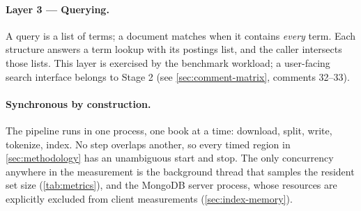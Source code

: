 \paragraph{Layer 3 --- Querying.}
A query is a list of terms; a document matches when it contains \emph{every}
term. Each structure answers a term lookup with its postings list, and the
caller intersects those lists. This layer is exercised by the benchmark
workload; a user-facing search interface belongs to Stage 2 (see
\cref{sec:comment-matrix}, comments 32--33).

\paragraph{Synchronous by construction.}
The pipeline runs in one process, one book at a time: download, split, write,
tokenize, index. No step overlaps another, so every timed region in
\cref{sec:methodology} has an unambiguous start and stop. The only
concurrency anywhere in the measurement is the background thread that samples
the resident set size (\cref{tab:metrics}), and the MongoDB server process,
whose resources are explicitly excluded from client measurements
(\cref{sec:index-memory}).
